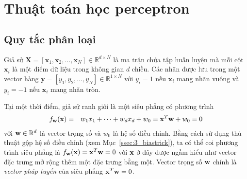 






\section{Thuật toán học perceptron}



\subsection{Quy tắc phân loại}
Giả sử $\mathbf{X} = [\mathbf{x}_1, \mathbf{x}_2, \dots, \mathbf{x}_N] \in \mathbb{R}^{d \times N}$ là ma trận chứa tập huấn luyện mà mỗi cột $\mathbf{x}_i$ là một điểm dữ liệu trong không gian $d$ chiều.
Các nhãn được lưu trong một vector hàng $\mathbf{y} = [y_1, y_2, \dots, y_N] \in \mathbb{R}^{1\times N}$ với $y_i = 1$ nếu $\mathbf{x}_i$ mang nhãn vuông và $y_i = -1$ nếu $\mathbf{x}_i$ mang nhãn tròn.

Tại một thời điểm, giả sử ranh giới là một siêu phẳng có phương trình
\begin{eqnarray}
f_{\mathbf{w}}(\mathbf{x}) &=& w_1x_1 + \dots + w_dx_d + w_0 =\mathbf{x}^T\mathbf{w} + w_0 = 0
\end{eqnarray}
với $\mathbf{w} \in \mathbb{R}^d$ là vector trọng số và $w_0$ là hệ số điều chỉnh. Bằng cách sử dụng thủ thuật gộp hệ số điều chỉnh (xem Mục~\ref{ssec:3_biastrick}), ta có thể coi phương trình siêu phẳng là
$f_{\mathbf{w}}(\mathbf{x}) = \mathbf{x}^T\mathbf{w} = 0$ với $\mathbf{x}$ ở đây được ngầm hiểu như vector đặc
trưng mở rộng thêm một đặc trưng bằng một. Vector trọng số $\mathbf{w}$ chính là
\textit{vector pháp tuyến} của siêu phẳng $\mathbf{x}^T\mathbf{w} = 0$.


